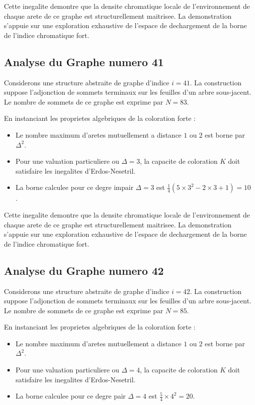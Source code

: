 \documentclass[11pt,a4paper]{article}
\begin{document}
Cette inegalite demontre que la densite chromatique locale de l'environnement de chaque arete de ce graphe est structurellement maitrisee. La demonstration s'appuie sur une exploration exhaustive de l'espace de dechargement de la borne de l'indice chromatique fort.

\subsection{Analyse du Graphe numero 41}
Considerons une structure abstraite de graphe d'indice $i = 41$. La construction suppose l'adjonction de sommets terminaux sur les feuilles d'un arbre sous-jacent. Le nombre de sommets de ce graphe est exprime par $N = 83$.

En instanciant les proprietes algebriques de la coloration forte :
\begin{itemize}
\item Le nombre maximum d'aretes mutuellement a distance $1$ ou $2$ est borne par $\Delta^2$.
\item Pour une valuation particuliere ou $\Delta = 3$, la capacite de coloration $K$ doit satisfaire les inegalites d'Erdos-Nesetril.
\item La borne calculee pour ce degre impair $\Delta = 3$ est $\frac{1}{4}(5 \times 3^2 - 2 \times 3 + 1) = 10$.
\end{itemize}

Cette inegalite demontre que la densite chromatique locale de l'environnement de chaque arete de ce graphe est structurellement maitrisee. La demonstration s'appuie sur une exploration exhaustive de l'espace de dechargement de la borne de l'indice chromatique fort.

\subsection{Analyse du Graphe numero 42}
Considerons une structure abstraite de graphe d'indice $i = 42$. La construction suppose l'adjonction de sommets terminaux sur les feuilles d'un arbre sous-jacent. Le nombre de sommets de ce graphe est exprime par $N = 85$.

En instanciant les proprietes algebriques de la coloration forte :
\begin{itemize}
\item Le nombre maximum d'aretes mutuellement a distance $1$ ou $2$ est borne par $\Delta^2$.
\item Pour une valuation particuliere ou $\Delta = 4$, la capacite de coloration $K$ doit satisfaire les inegalites d'Erdos-Nesetril.
\item La borne calculee pour ce degre pair $\Delta = 4$ est $\frac{5}{4} \times 4^2 = 20$.
\end{itemize}
\end{document}
